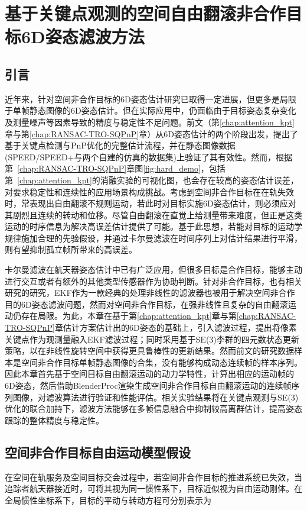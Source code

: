 \chapter{基于关键点观测的空间自由翻滚非合作目标6D姿态滤波方法}
\label{chap:SpaceFreeMotionEKF}
\section{引言}
近年来，针对空间非合作目标的6D姿态估计研究已取得一定进展，但更多是局限于单帧静态图像的6D姿态估计。但在实际应用中，仍面临由于目标姿态复杂变化及测量噪声等因素导致的精度与稳定性不足问题。前文（第\ref{chap:attention_kpt}章与第\ref{chap:RANSAC-TRO-SQPnP}章）从6D姿态估计的两个阶段出发，提出了基于关键点检测与PnP优化的完整估计流程，并在静态图像数据(SPEED/SPEED+与两个自建的仿真的数据集)上验证了其有效性。然而，根据第~\ref{chap:RANSAC-TRO-SQPnP}章图\ref{fig:hard_demo}，包括第~\ref{chap:attention_kpt}的消融实验的可视化图，也会存在较高的姿态估计误差，对要求稳定性和连续性的应用场景构成挑战。考虑到空间非合作目标在在轨失效时，常表现出自由翻滚不规则运动，若此时对目标实施6D姿态估计，则必须应对其剧烈且连续的转动和位移。尽管自由翻滚在直觉上给测量带来难度，但正是这类运动的时序信息为解决高误差估计提供了可能。基于此思想，若能对目标的运动学规律施加合理的先验假设，并通过卡尔曼滤波在时间序列上对估计结果进行平滑，则有望抑制孤立帧所带来的高误差。

卡尔曼滤波在航天器姿态估计中已有广泛应用，但很多目标是合作目标，能够主动进行交互或者有额外的其他类型传感器作为协助判断\cite{DQWX202212007,CHWZ202205009,hudoba2024distributed}。针对非合作目标，也有相关研究的研究\cite{s24061811,zhang2023pose,XDFJ20250225001}，EKF作为一款经典的处理非线性的滤波器也被用于解决空间非合作目的6D姿态滤波问题，然而对空间非合作目标，在强非线性且复杂的自由翻滚运动仍存在局限。为此，本章在基于第\ref{chap:attention_kpt}章与第\ref{chap:RANSAC-TRO-SQPnP}章估计方案估计出的6D姿态的基础上，引入滤波过程，提出将像素关键点作为观测量融入EKF滤波过程；同时采用基于SE(3)李群的四元数状态更新策略，以在非线性旋转空间中获得更具鲁棒性的更新结果。然而前文的研究数据样本是空间非合作目标单帧静态图像的合集，没有能够构成动态连续帧的样本序列。因此本章首先基于空间目标自由翻滚运动的动力学特性，计算出相应的运动帧的6D姿态，然后借助BlenderProc渲染生成空间非合作目标自由翻滚运动的连续帧序列图像，对滤波算法进行验证和性能评估。相关实验结果将在关键点观测与SE(3)优化的联合加持下，滤波方法能够在多帧信息融合中抑制较高离群估计，提高姿态跟踪的整体精度与稳定性。



\section{空间非合作目标自由运动模型假设}
在空间在轨服务及空间目标交会过程中，若空间非合作目标的推进系统已失效，当追踪者航天器接近时，可将其视为同一惯性系下，目标近似视为自由运动刚体。在全局惯性坐标系下，目标的平动与转动方程可分别表示为

